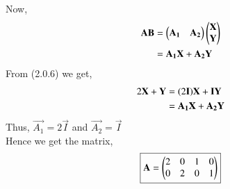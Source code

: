 \documentclass[journal,12pt,twocolumn]{IEEEtran}
\begin{document}
Now, 
\begin{align}
    \vec{A}\vec{B} &= \myvec{\vec{A_{1}}& \vec{A_{2}}}\myvec{\vec{X} \\ \vec{Y}}\notag\\
    &= \vec{A_{1}}\vec{X} + \vec{A_{2}}\vec{Y}
\end{align}
From (2.0.6) we get, 
\begin{align}
    2\vec{X}+\vec{Y} &= (2\vec{I})\vec{X} + \vec{I}\vec{Y}\notag\\
    &=\vec{A_{1}}\vec{X} + \vec{A_{2}}\vec{Y}
\end{align}
Thus, $\vec{A_{1}} = 2\vec{I}$ and $\vec{A_{2}} = \vec{I}$ \\
Hence we get the matrix, 
\begin{align*}
    \boxed{\vec{A} =  \myvec{2 & 0 & 1 & 0 \\ 0 & 2 & 0 & 1}}
\end{align*}
\end{document}
